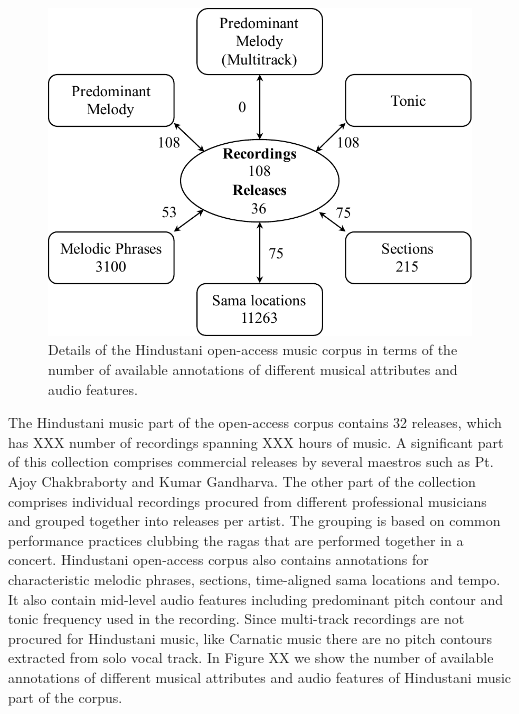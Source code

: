 \begin{figure}
	\begin{center}
		\includegraphics[width=\figSizeNinety]{ch04_datasets/figures/hindustani_CC_details.pdf}
	\end{center}
	\caption{Details of the Hindustani open-access music corpus in terms of the number of available annotations of different musical attributes and audio features.}
	\label{fig:hindustani_open_access_corpus_details}
\end{figure}

The Hindustani music part of the open-access corpus contains 32 releases, which has XXX number of recordings spanning XXX hours of music. A significant part of this collection comprises commercial releases by several maestros such as Pt. Ajoy Chakbraborty and Kumar Gandharva. The other part of the collection comprises individual recordings procured from different professional musicians and grouped together into releases per artist. The grouping is based on common performance practices clubbing the \glspl{raga} that are performed together in a concert. Hindustani open-access corpus also contains annotations for characteristic melodic phrases, sections, time-aligned sama locations and tempo. It also contain mid-level audio features including predominant pitch contour and tonic  frequency used in the recording. Since multi-track recordings are not procured for Hindustani music, like Carnatic music there are no pitch contours extracted from solo vocal track. In Figure XX we show the number of available annotations of different musical attributes and audio features of Hindustani music part of the corpus. 

